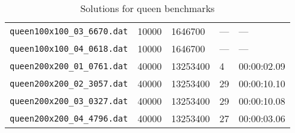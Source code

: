 \documentclass{article}
\begin{document}
\begin{table}
\begin{tabular}{y{3.6cm}x{1cm}x{1.5cm}x{1.5cm}y{1.5cm}}
    \verb|queen100x100_03_6670.dat| & 10000 &  1646700 & --- & --- \\
    \verb|queen100x100_04_0618.dat| & 10000 &  1646700 & --- & --- \\
    \verb|queen200x200_01_0761.dat| & 40000 & 13253400 &   4 & 00:00:02.09 \\
    \verb|queen200x200_02_3057.dat| & 40000 & 13253400 &  29 & 00:00:10.10 \\
    \verb|queen200x200_03_0327.dat| & 40000 & 13253400 &  29 & 00:00:10.08 \\
    \verb|queen200x200_04_4796.dat| & 40000 & 13253400 &  27 & 00:00:03.06 \\
  \end{tabular}
  \caption{Solutions for queen benchmarks}
\end{table}
\end{document}
